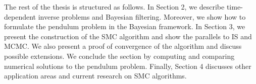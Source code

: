 The rest of the thesis is structured as follows. In Section 2, we describe time-dependent inverse problems and Bayesian filtering. Moreover, we show how to formulate the pendulum problem in the Bayesian framework. In Section 3, we present the construction of the SMC algorithm and show the parallels to IS and MCMC. We also present a proof of convergence of the algorithm and discuss possible extensions. We conclude the section by computing and comparing numerical solutions to the pendulum problem. Finally, Section 4 discusses other application areas and current research on SMC algorithms.

